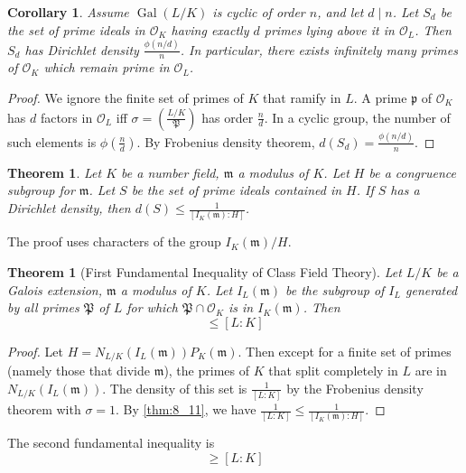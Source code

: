 \documentclass[11pt]{article}
\theoremstyle{definition}
\theoremstyle{plain}
\newtheorem{theorem}[definition]{Theorem}
\newtheorem{corollary}[definition]{Corollary}
\theoremstyle{remark}
\DeclareMathOperator{\Gal}{Gal}
\newcommand{\cO}{\mathcal{O}}
\newcommand{\cp}{\mathfrak{P}}
\newcommand{\fp}{\mathfrak{p}}
\newcommand{\fm}{\mathfrak{m}}
\newcommand{\leg}[2]{\left(\frac{#1}{#2}\right)}
\begin{document}
\begin{corollary}\label{cor:8_10}
    Assume $\Gal(L/K)$ is cyclic of order $n$, and let $d \mid n$. Let $S_d$ be the set of prime ideals in $\cO_K$ having exactly $d$ primes lying above it in $\cO_L$. Then $S_d$ has Dirichlet density $\frac{\phi(n/d)}{n}$. In particular, there exists infinitely many primes of $\cO_K$ which remain prime in $\cO_L$.
\end{corollary}
\begin{proof}
    We ignore the finite set of primes of $K$ that ramify in $L$. A prime $\fp$ of $\cO_K$ has $d$ factors in $\cO_L$ iff $\sigma = \leg{L/K}{\cp}$ has order $\frac{n}{d}$. In a cyclic group, the number of such elements is $\phi\left(\frac{n}{d}\right)$. By Frobenius density theorem, $d(S_d) = \frac{\phi(n/d)}{n}$.
\end{proof}

\begin{theorem}\label{thm:8_11}
    Let $K$ be a number field, $\fm$ a modulus of $K$. Let $H$ be a congruence subgroup for $\fm$. Let $S$ be the set of prime ideals contained in $H$. If $S$ has a Dirichlet density, then $d(S) \le \frac{1}{[I_K(\fm):H]}$.
\end{theorem}
\noindent The proof uses characters of the group $I_K(\fm) / H$.

\begin{theorem}[First Fundamental Inequality of Class Field Theory]\label{thm:8_12}
    Let $L/K$ be a Galois extension, $\fm$ a modulus of $K$. Let $I_L(\fm)$ be the subgroup of $I_L$ generated by all primes $\cp$ of $L$ for which $\cp \cap \cO_K$ is in $I_K(\fm)$. Then
    \begin{equation*}
        [I_K(\fm) : N_{L/K}(I_L(\fm)) P_K(\fm)] \le [L:K]
    \end{equation*}
\end{theorem}
\begin{proof}
    Let $H = N_{L/K}(I_L(\fm)) P_K(\fm)$. Then except for a finite set of primes (namely those that divide $\fm$), the primes of $K$ that split completely in $L$ are in $N_{L/K}(I_L(\fm))$. The density of this set is $\frac{1}{[L:K]}$ by the Frobenius density theorem with $\sigma = 1$. By \autoref{thm:8_11}, we have $\frac{1}{[L:K]} \le \frac{1}{[I_K(\fm) : H]}$.
\end{proof}

\noindent The second fundamental inequality is
\begin{equation*}
    [I_K(\fm) : N_{L/K}(I_L(\fm)) P_K(\fm)] \ge [L : K]
\end{equation*}
\end{document}
